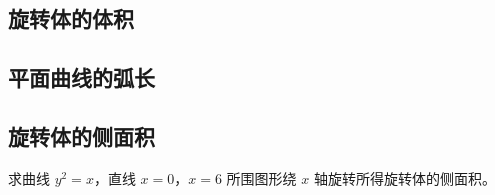 \subsection{旋转体的体积}
\begin{Practice}
  \begin{question}
    \item 
    \item 
    \item 
  \end{question}
\end{Practice}

\subsection*{平面曲线的弧长}
\begin{Practice}
  \begin{question}
    \item 
    \item 
  \end{question}
\end{Practice}

\subsection*{旋转体的侧面积}
\begin{Practice}
  求曲线 $y^2=x$，直线 $x=0$，$x=6$ 所围图形绕 $x$ 轴旋转所得旋转体的侧面积。
\end{Practice}

\begin{Exercise}
  \begin{question}
    \item 
    \item 
    \item 
    \item 
    \item 
    \item 
    \item 
    \item 
  \end{question}
\end{Exercise}

